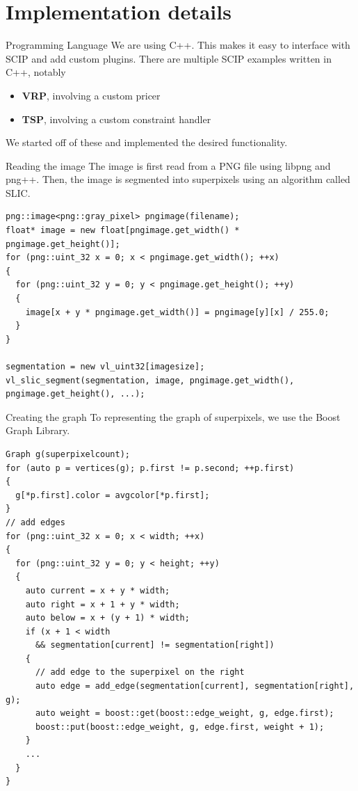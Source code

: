 \documentclass[fleqn]{beamer}
\begin{document}
	\section{Implementation details}
    \begin{frame}{Programming Language}
        We are using C++.
        This makes it easy to interface with SCIP and add custom plugins.
        There are multiple SCIP examples written in C++, notably
        \begin{itemize}
            \item \textbf{VRP}, involving a custom pricer %
            \item \textbf{TSP}, involving a custom constraint handler %
        \end{itemize}
        We started off of these and implemented the desired functionality.
    \end{frame}

    \begin{frame}[fragile]{Reading the image}
        The image is first read from a PNG file using libpng and png++.
        Then, the image is segmented into superpixels using an algorithm called SLIC. %
        
        \begin{verbatim}
png::image<png::gray_pixel> pngimage(filename);
float* image = new float[pngimage.get_width() * pngimage.get_height()];
for (png::uint_32 x = 0; x < pngimage.get_width(); ++x)
{
  for (png::uint_32 y = 0; y < pngimage.get_height(); ++y)
  {
    image[x + y * pngimage.get_width()] = pngimage[y][x] / 255.0;
  }
}

segmentation = new vl_uint32[imagesize];
vl_slic_segment(segmentation, image, pngimage.get_width(), pngimage.get_height(), ...);
        \end{verbatim}
    \end{frame}
    
    \begin{frame}[fragile]{Creating the graph}
        To representing the graph of superpixels, we use the Boost Graph Library.
        
		\begin{verbatim}
Graph g(superpixelcount);
for (auto p = vertices(g); p.first != p.second; ++p.first)
{
  g[*p.first].color = avgcolor[*p.first];
}	
// add edges
for (png::uint_32 x = 0; x < width; ++x)
{
  for (png::uint_32 y = 0; y < height; ++y)
  {
    auto current = x + y * width;
    auto right = x + 1 + y * width;
    auto below = x + (y + 1) * width;
    if (x + 1 < width
      && segmentation[current] != segmentation[right])
    {
      // add edge to the superpixel on the right
      auto edge = add_edge(segmentation[current], segmentation[right], g);
      auto weight = boost::get(boost::edge_weight, g, edge.first);
      boost::put(boost::edge_weight, g, edge.first, weight + 1);
    }
    ...
  }
}
		\end{verbatim}
	\end{frame}
	
\end{document}
